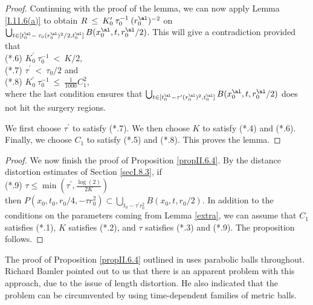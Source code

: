 \begin{proof}

Continuing with the proof of the lemma,
we can now apply Lemma \ref{I.11.6(a)} to obtain
$R \: \le \: K_0^\prime \: \tau_0^{-1}
\: (r_0^\al)^{-2}$ on
$\bigcup_{t \in [t_0^\al - \: \tau_0 (r_0^\al)^2/2, t_0^\al]}
B(x_0^\al, t, r_0^\al/2)$. This will
give a contradiction provided that \\
(*.6) $K_0^\prime \: \tau_0^{-1} \: < \: K/2$, \\
(*.7) $\tau^\prime \: < \: \tau_0/2$ and \\
(*.8) $K_0^\prime \: \tau_0^{-1} \: \le \: \frac{1}{1000} C_1^2$, \\
where the last condition ensures that
$\bigcup_{t \in [t_0^\al-\tau^\prime (r_0^\al)^2, t_0^\al]}
B(x_0^\al, t, r_0^\al/2)$
does not hit the surgery regions.

We first choose $\tau^\prime$ to satisfy (*.7).
We then choose $K$ to satisfy (*.4) and (*.6).
Finally, we choose $C_1$ to
satisfy (*.5) and (*.8).
This proves the lemma.
\end{proof}
\begin{proof}

We now finish the proof of Proposition \ref{propII.6.4}.
By the distance distortion estimates of Section \ref{secI.8.3}, if\\
(*.9) $\tau \le \min \left( \tau^\prime, \frac{\log(2)}{2K} \right)$\\
then $P(x_0, t_0, r_0/4, -\tau r_0^2) \subset
\bigcup_{t_0 - \tau^\prime r_0^2} B(x_0, t, r_0/2)$.
In addition to the conditions on the parameters coming from
Lemma \ref{extra}, we can assume that $C_1$ satisfies (*.1),
$K$ satisfies (*.2), and
$\tau$ satisfies (*.3) and (*.9). The proposition follows.
\end{proof}

\begin{remark}
  \label{rem:kl-earlier-scalar-curvature-bounds-smaller-balls-from-lower-curvature-bound-existence-scalar-curvature}

The proof of Proposition \ref{propII.6.4} outlined in
\cite[Pf. of II.6.4]{Perelman2}
uses parabolic balls throughout.  Richard Bamler pointed out
to us that there is an apparent problem with this approach,
due to the issue of length distortion.
He also indicated that the problem can be circumvented
by using time-dependent families of metric balls.
\end{remark}


